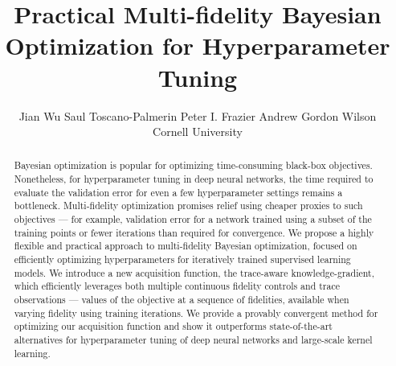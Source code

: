 \documentclass[letterpaper]{article}
\title{Practical Multi-fidelity Bayesian Optimization for Hyperparameter Tuning}
\author{
Jian Wu \quad
Saul Toscano-Palmerin \quad
Peter I. Frazier \quad
Andrew Gordon Wilson \\
Cornell University
}
\numberwithin{equation}{section}
\newcommand{\xxcomment}[4]{\textcolor{#1}{[$^{\textsc{#2}}_{\textsc{#3}}$ #4]}}
\newcommand{\agw}[1]{\xxcomment{red}{A}{W}{#1}}
\newcommand{\pf}[1]{\xxcomment{blue}{P}{F}{#1}}
\begin{document}
\maketitle

\begin{abstract}

Bayesian optimization is popular for optimizing time-consuming black-box objectives.
Nonetheless, for hyperparameter tuning in deep neural networks,
the time required to evaluate the validation error for even a few hyperparameter settings remains a bottleneck.
Multi-fidelity optimization promises relief using cheaper proxies to such objectives ---  for example, validation error for a network trained using a subset of the training points or fewer iterations than required for convergence.
We propose a highly flexible and practical approach to multi-fidelity Bayesian optimization, 
focused on efficiently optimizing hyperparameters for iteratively trained supervised learning models.
We introduce a new acquisition function, the trace-aware knowledge-gradient, which efficiently leverages both multiple continuous fidelity controls and trace observations --- values of the objective at a sequence of fidelities, available when varying fidelity using training iterations. 
We provide a provably convergent method for optimizing our acquisition function
and show it outperforms state-of-the-art alternatives for  hyperparameter tuning of deep neural networks and large-scale kernel learning. 

\end{abstract}
\end{document}
